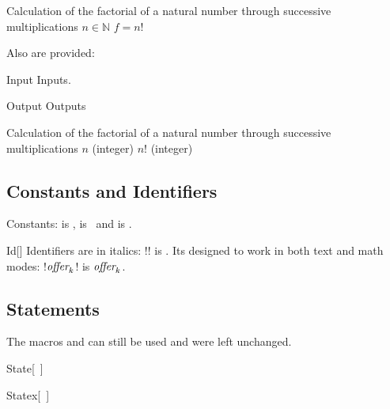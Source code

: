 \documentclass[a4paper, 11pt]{article}
\begin{document}
\begin{tcblisting}{}
    \begin{algorithmic}
        \Description Calculation of the factorial of a natural number through successive multiplications
        \Require $n \in \mathbb{N}$
        \Ensure $f = n!$
    \end{algorithmic}
\end{tcblisting}

Also are provided:
\begin{macro}{Input}
    Inputs.
\end{macro}
\begin{macro}{Output}
    Outputs
\end{macro}

\begin{tcblisting}{}
    \begin{algorithmic}
        \Description Calculation of the factorial of a natural number through successive multiplications
        \Input $n$ (integer)
        \Output $n!$ (integer)
    \end{algorithmic}
\end{tcblisting}

\subsection{Constants and Identifiers}

Constants:  is \True,  is \False\ and  is \Nil.

\begin{macro}{Id}[]
    Identifiers are in italics: \latexinline!! is . Its designed to work in both text and math modes: \latexinline!$\textit{\rmfamily offer}_k$! is $\textit{\rmfamily offer}_k$.
\end{macro}

\subsection{Statements}

The macros  and  can still be used and were left unchanged.

\begin{macro}{State}[~]
\end{macro}

\begin{macro}{Statex}[~]
\end{macro}
\end{document}
